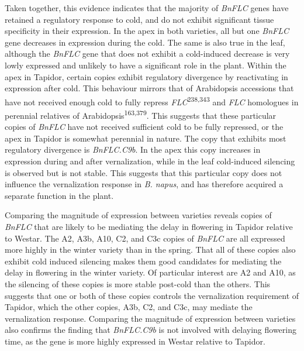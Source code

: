 \documentclass[12pt,]{book}
\begin{document}
Taken together, this evidence indicates that the majority of
\emph{BnFLC} genes have retained a regulatory response to cold, and do
not exhibit significant tissue specificity in their expression. In the
apex in both varieties, all but one \emph{BnFLC} gene decreases in
expression during the cold. The same is also true in the leaf, although
the \emph{BnFLC} gene that does not exhibit a cold-induced decrease is
very lowly expressed and unlikely to have a significant role in the
plant. Within the apex in Tapidor, certain copies exhibit regulatory
divergence by reactivating in expression after cold. This behaviour
mirrors that of Arabidopsis accessions that have not received enough
cold to fully repress \emph{FLC}\textsuperscript{238,343} and \emph{FLC}
homologues in perennial relatives of
Arabidopsis\textsuperscript{163,379}. This suggests that these
particular copies of \emph{BnFLC} have not received sufficient cold to
be fully repressed, or the apex in Tapidor is somewhat perennial in
nature. The copy that exhibits most regulatory divergence is
\emph{BnFLC.C9b}. In the apex this copy increases in expression during
and after vernalization, while in the leaf cold-induced silencing is
observed but is not stable. This suggests that this particular copy does
not influence the vernalization response in \emph{B. napus}, and has
therefore acquired a separate function in the plant.

Comparing the magnitude of expression between varieties reveals copies
of \emph{BnFLC} that are likely to be mediating the delay in flowering
in Tapidor relative to Westar. The A2, A3b, A10, C2, and C3c copies of
\emph{BnFLC} are all expressed more highly in the winter variety than in
the spring. That all of these copies also exhibit cold induced silencing
makes them good candidates for mediating the delay in flowering in the
winter variety. Of particular interest are A2 and A10, as the silencing
of these copies is more stable post-cold than the others. This suggests
that one or both of these copies controls the vernalization requirement
of Tapidor, which the other copies, A3b, C2, and C3c, may mediate the
vernalization response. Comparing the magnitude of expression between
varieties also confirms the finding that \emph{BnFLC.C9b} is not
involved with delaying flowering time, as the gene is more highly
expressed in Westar relative to Tapidor.
\end{document}
